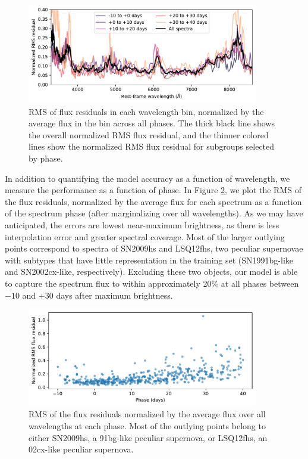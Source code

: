 \begin{figure}
    \centering
\includegraphics[width=0.9\textwidth]{figures/nn_twins/embed2spec_rms_wavelength.pdf}
    \caption{RMS of \etos{} flux residuals in each wavelength bin, normalized by the average flux in the bin across all phases. The thick black line shows the overall normalized RMS flux residual, and the thinner colored lines show the normalized RMS flux residual for subgroups selected by phase.}
    \label{fig:e2s_wavelength_resids}
\end{figure}

In addition to quantifying the model accuracy as a function of wavelength, we measure the performance as a function of phase. In Figure \ref{fig:e2s_phase_resids}, we plot the RMS of the flux residuals, normalized by the average flux for each spectrum as a function of the spectrum phase (after marginalizing over all wavelengths). As we may have anticipated, the errors are lowest near-maximum brightness, as there is less interpolation error and greater spectral coverage. Most of the larger outlying points correspond to spectra of SN2009hs and LSQ12fhs, two peculiar supernovae with subtypes that have little representation in the training set (SN1991bg-like and SN2002cx-like, respectively). Excluding these two objects, our model is able to capture the spectrum flux to within approximately 20\% at all phases between $-10$ and $+30$ days after maximum brightness.

\begin{figure}
    \centering
    \includegraphics[width=0.9\textwidth]{figures/nn_twins/embed2spec_rms_phase.pdf}
    \caption{RMS of the flux residuals normalized by the average flux over all wavelengths at each phase. Most of the outlying points belong to either SN2009hs, a 91bg-like peculiar supernova, or LSQ12fhs, an 02cx-like peculiar supernova.}
    \label{fig:e2s_phase_resids}
\end{figure}

